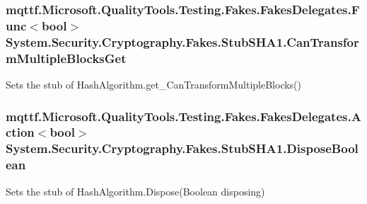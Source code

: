 \hypertarget{class_system_1_1_security_1_1_cryptography_1_1_fakes_1_1_stub_s_h_a1_a5992f111d1af57c9b43ada4ff2ff46f7}{
\subsubsection[{Can\-Transform\-Multiple\-Blocks\-Get}]{\setlength{\rightskip}{0pt plus 5cm}mqttf.\-Microsoft.\-Quality\-Tools.\-Testing.\-Fakes.\-Fakes\-Delegates.\-Func$<$bool$>$ System.\-Security.\-Cryptography.\-Fakes.\-Stub\-S\-H\-A1.\-Can\-Transform\-Multiple\-Blocks\-Get}}\label{class_system_1_1_security_1_1_cryptography_1_1_fakes_1_1_stub_s_h_a1_a5992f111d1af57c9b43ada4ff2ff46f7}


Sets the stub of Hash\-Algorithm.\-get\-\_\-\-Can\-Transform\-Multiple\-Blocks()

\hypertarget{class_system_1_1_security_1_1_cryptography_1_1_fakes_1_1_stub_s_h_a1_ac4bd573e9a5f7dbcaf0429be4878bcd3}{
\subsubsection[{Dispose\-Boolean}]{\setlength{\rightskip}{0pt plus 5cm}mqttf.\-Microsoft.\-Quality\-Tools.\-Testing.\-Fakes.\-Fakes\-Delegates.\-Action$<$bool$>$ System.\-Security.\-Cryptography.\-Fakes.\-Stub\-S\-H\-A1.\-Dispose\-Boolean}}\label{class_system_1_1_security_1_1_cryptography_1_1_fakes_1_1_stub_s_h_a1_ac4bd573e9a5f7dbcaf0429be4878bcd3}


Sets the stub of Hash\-Algorithm.\-Dispose(\-Boolean disposing)

